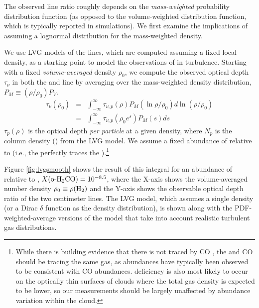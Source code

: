 The observed \formaldehyde line ratio roughly depends on the \emph{mass-weighted}
probability distribution function (as opposed to the volume-weighted
distribution function, which is typically reported in simulations).  We first
examine the implications of assuming a lognormal distribution for the
mass-weighted density.

We use LVG models of the \formaldehyde lines, which are computed assuming a
fixed local density, as a starting point to model the observations of
\formaldehyde in turbulence.   Starting with a fixed \emph{volume-averaged}
density $\rho_0$, we compute the observed \formaldehyde optical depth $\tau_\nu$ in both
the \oneone and \twotwo
line by averaging over the mass-weighted density distribution, $P_M\equiv(\rho/\rho_0) P_V$.
\begin{eqnarray}
    \label{eqn:tauintegral}
    \tau_{\nu}(\rho_0) &=& \int_{-\infty}^\infty \tau_{\nu,p}(\rho) P_M(\ln \rho/\rho_0) d \ln (\rho/\rho_0)\\
                       &=& \int_{-\infty}^\infty \tau_{\nu,p}(\rho_0 e^s) P_M(s) d s
\end{eqnarray} %
$\tau_p(\rho)$ is the optical depth \emph{per particle} at a given density, where $N_p$ is the column
density (\perkmspc) from the LVG model.
We assume a fixed abundance of \ortho relative to \hh
(i.e., the \formaldehyde perfectly traces the \hh).\footnote{While there is
building evidence that there is \hh not traced by CO
\citep{Shetty2011b,Shetty2011a}, the \formaldehyde and CO should be tracing the
same gas, as \formaldehyde abundances have typically been observed to be
consistent with CO abundances.  \formaldehyde deficiency is also most likely to
occur on the optically thin surfaces of clouds where the total gas density is
expected to be lower, so our measurements should be largely unaffected by
abundance variation within the cloud.}

Figure \ref{fig:lvgsmooth}
shows the result of this integral for an abundance of \ortho relative to \hh, 
$X(\textrm{o-H}_2\textrm{CO})=10^{-8.5}$, where the X-axis shows the volume-averaged number density $\rho_0 \equiv \rho(\textrm{H}_{2})$ and the Y-axis
shows the observable optical depth ratio of the two \formaldehyde centimeter
lines.
The LVG model, which assumes a single density
(or a Dirac $\delta$ function as the density distribution), is shown along with
the PDF-weighted-average versions of the model that take into account realistic turbulent
gas distributions.  

